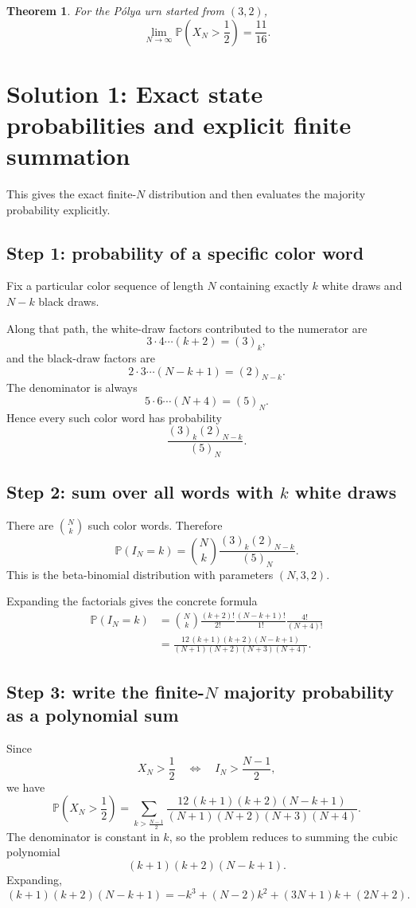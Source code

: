\documentclass[12pt]{article}
\newtheorem{theorem}{Theorem}
\begin{document}
\begin{theorem}
For the P\'olya urn started from $(3,2)$,
\[
\lim_{N\to\infty}\mathbb{P}\!\left(X_N>\frac12\right)=\frac{11}{16}.
\]
\end{theorem}

\section{Solution 1: Exact state probabilities and explicit finite summation}

This gives the exact finite-$N$ distribution and then evaluates the majority probability explicitly.

\subsection*{Step 1: probability of a specific color word}
Fix a particular color sequence of length $N$ containing exactly $k$ white draws and $N-k$ black draws.

Along that path, the white-draw factors contributed to the numerator are
\[
3\cdot 4\cdots (k+2)=(3)_k,
\]
and the black-draw factors are
\[
2\cdot 3\cdots (N-k+1)=(2)_{N-k}.
\]
The denominator is always
\[
5\cdot 6\cdots (N+4)=(5)_N.
\]
Hence every such color word has probability
\[
\frac{(3)_k(2)_{N-k}}{(5)_N}.
\]

\subsection*{Step 2: sum over all words with $k$ white draws}
There are $\binom{N}{k}$ such color words. Therefore
\[
\mathbb{P}(I_N=k)=\binom{N}{k}\frac{(3)_k(2)_{N-k}}{(5)_N}.
\]
This is the beta-binomial distribution with parameters $(N,3,2)$.

Expanding the factorials gives the concrete formula
\begin{align*}
\mathbb{P}(I_N=k)
&=
\binom{N}{k}\frac{(k+2)!}{2!}\frac{(N-k+1)!}{1!}\frac{4!}{(N+4)!} \\
&=
\frac{12\,(k+1)(k+2)(N-k+1)}{(N+1)(N+2)(N+3)(N+4)}.
\end{align*}

\subsection*{Step 3: write the finite-$N$ majority probability as a polynomial sum}
Since
\[
X_N>\frac12
\quad\Longleftrightarrow\quad
I_N>\frac{N-1}{2},
\]
we have
\[
\mathbb{P}\!\left(X_N>\frac12\right)
=
\sum_{k>\frac{N-1}{2}}
\frac{12\,(k+1)(k+2)(N-k+1)}{(N+1)(N+2)(N+3)(N+4)}.
\]
The denominator is constant in $k$, so the problem reduces to summing the cubic polynomial
\[
(k+1)(k+2)(N-k+1).
\]
Expanding,
\[
(k+1)(k+2)(N-k+1)
=
-k^3+(N-2)k^2+(3N+1)k+(2N+2).
\]
\end{document}
